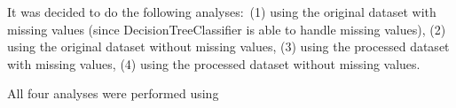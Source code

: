 \documentclass{article}
\begin{document}
It was decided to do the following analyses:\ (1) using the original dataset with missing values (since DecisionTreeClassifier is able to handle missing values), (2) using the original dataset without missing values, (3) using the processed dataset with missing values, (4) using the processed dataset without missing values.

All four analyses were performed using
\end{document}
